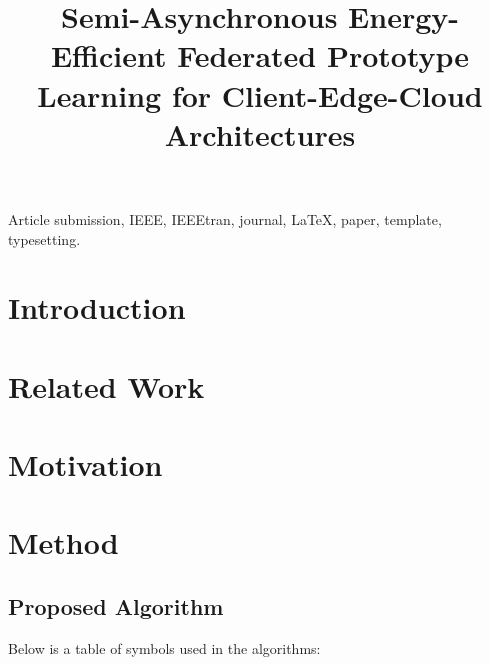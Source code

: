 \documentclass[journal]{IEEEtran}
\begin{document}
\title{Semi-Asynchronous Energy-Efficient Federated Prototype Learning for Client-Edge-Cloud Architectures}




\maketitle

\begin{abstract}

\end{abstract}

\begin{IEEEkeywords}
  Article submission, IEEE, IEEEtran, journal, \LaTeX, paper, template, typesetting.
\end{IEEEkeywords}

\section{Introduction}

\section{Related Work}

\section{Motivation}

\section{Method}
\subsection{Proposed Algorithm}
Below is a table of symbols used in the algorithms:
\end{document}
